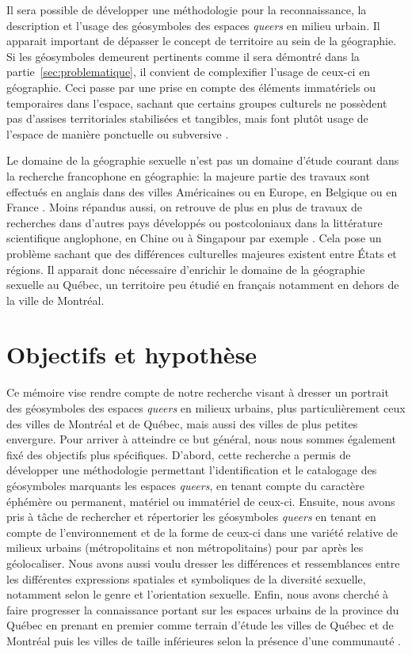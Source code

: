 Il sera possible de développer une méthodologie pour la reconnaissance, la description et l'usage des géosymboles des espaces \emph{queers} en milieu urbain.
Il apparait important de dépasser le concept de territoire au sein de la
géographie.
Si les géosymboles demeurent pertinents comme il sera démontré dans la partie~\ref{sec:problematique}, il convient de complexifier l'usage de ceux-ci en géographie.
Ceci passe par une prise en compte des éléments immatériels ou temporaires dans l'espace, sachant que certains groupes culturels ne possèdent pas d'assises territoriales stabilisées et tangibles, mais font plutôt usage de l'espace de manière ponctuelle ou subversive \parencite{Talburt2012}.

Le domaine de la géographie sexuelle n'est pas un domaine d'étude courant dans
la recherche francophone en géographie: la majeure partie des travaux sont effectués en anglais dans des villes Américaines ou en Europe, en Belgique ou en France \parencite{Blidon2010,Blidon2006,Cattan2010,Deligne2006}.
Moins répandus aussi, on retrouve de plus en plus de travaux de recherches dans d'autres pays développés ou postcoloniaux dans la littérature scientifique anglophone, en Chine ou à Singapour par exemple \parencite{Oswin2014a,Kong2012}.
Cela pose un problème sachant que des différences culturelles majeures existent entre États et régions. 
Il apparait donc nécessaire d'enrichir le domaine de la géographie sexuelle au Québec, un territoire peu étudié en français notamment en dehors de la ville de Montréal.


\section*{Objectifs et hypothèse}
Ce mémoire vise rendre compte de notre recherche visant à dresser un portrait des géosymboles des espaces \emph{queers} en milieux urbains, plus particulièrement ceux des villes de Montréal et de Québec, mais aussi des villes de plus petites envergure.
Pour arriver à atteindre ce but général, nous nous sommes également fixé des objectifs plus spécifiques.
D'abord, cette recherche a permis de développer une méthodologie permettant l'identification et le catalogage des géosymboles marquants les espaces \emph{queers}, en tenant compte du caractère éphémère ou permanent, matériel ou immatériel de ceux-ci. 
Ensuite, nous avons pris à tâche de rechercher et répertorier les géosymboles \emph{queers} en tenant en compte de l'environnement et de la forme de ceux-ci dans une variété relative de milieux urbains (métropolitains et non métropolitains) pour par après les géolocaliser.
Nous avons aussi voulu dresser les différences et ressemblances entre les différentes expressions spatiales et symboliques de la diversité sexuelle, notamment selon le genre et l'orientation sexuelle.
Enfin, nous avons cherché à faire progresser la connaissance portant sur les espaces \lgbt{} urbains de la province du Québec en prenant en premier comme terrain d'étude les villes de Québec et de Montréal puis les villes de taille inférieures selon la présence d'une communauté \lgbt{}.

